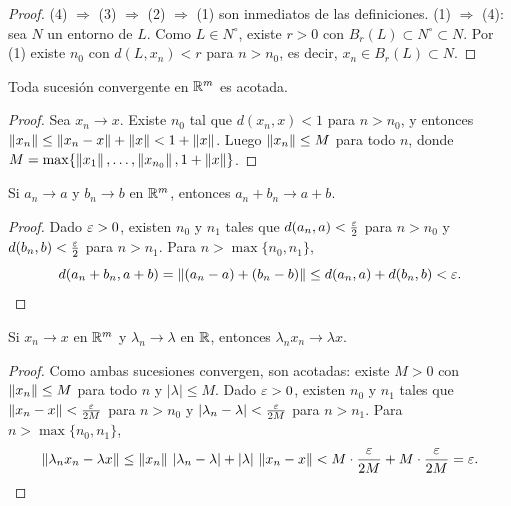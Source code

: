 \begin{proof}
  (4) \(\Rightarrow\) (3) \(\Rightarrow\) (2) \(\Rightarrow\) (1) son inmediatos de las definiciones. (1) \(\Rightarrow\) (4): sea \(N\) un entorno de \(L\). Como \(L \in N^{\circ}\), existe \(r > 0\) con \(B_r(L) \subset N^{\circ} \subset N\). Por (1) existe \(n_0\) con \(d(L, x_n) < r\) para \(n > n_0\), es decir, \(x_n \in B_r(L) \subset N\).
\end{proof}

\begin{prop}
  Toda sucesión convergente en \(\mathbb{R}^m\) es acotada.
\end{prop}

\begin{proof}
  Sea \(x_n \to x\). Existe \(n_0\) tal que \(d(x_n, x) < 1\) para \(n > n_0\), y entonces \(\left\lVert x_n \right\rVert \leq \left\lVert x_n - x \right\rVert + \left\lVert x \right\rVert < 1 + \left\lVert x \right\rVert\). Luego \(\left\lVert x_n \right\rVert \leq M\) para todo \(n\), donde \(M = \max\{ \left\lVert x_1 \right\rVert, \dots, \left\lVert x_{n_0} \right\rVert, 1 + \left\lVert x \right\rVert \}\).
\end{proof}

\begin{prop}
  Si \(a_n \to a\) y \(b_n \to b\) en \(\mathbb{R}^m\), entonces \(a_n + b_n \to a + b\).
\end{prop}

\begin{proof}
  Dado \(\varepsilon > 0\), existen \(n_0\) y \(n_1\) tales que \(d(a_n, a) < \frac{\varepsilon}{2}\) para \(n > n_0\) y \(d(b_n, b) < \frac{\varepsilon}{2}\) para \(n > n_1\). Para \(n > \max\{n_0, n_1\}\),
  \[
    d(a_n + b_n, a + b) = \left\lVert (a_n - a) + (b_n - b) \right\rVert \leq d(a_n, a) + d(b_n, b) < \varepsilon. \qedhere
  \]
\end{proof}

\begin{prop}
  Si \(x_n \to x\) en \(\mathbb{R}^m\) y \(\lambda_n \to \lambda\) en \(\mathbb{R}\), entonces \(\lambda_n x_n \to \lambda x\).
\end{prop}

\begin{proof}
  Como ambas sucesiones convergen, son acotadas: existe \(M > 0\) con \(\left\lVert x_n \right\rVert \leq M\) para todo \(n\) y \(|\lambda| \leq M\). Dado \(\varepsilon > 0\), existen \(n_0\) y \(n_1\) tales que \(\left\lVert x_n - x \right\rVert < \frac{\varepsilon}{2M}\) para \(n > n_0\) y \(|\lambda_n - \lambda| < \frac{\varepsilon}{2M}\) para \(n > n_1\). Para \(n > \max\{n_0, n_1\}\),
  \[
    \left\lVert \lambda_n x_n - \lambda x \right\rVert \leq \left\lVert x_n \right\rVert \, |\lambda_n - \lambda| + |\lambda| \, \left\lVert x_n - x \right\rVert < M \cdot \frac{\varepsilon}{2M} + M \cdot \frac{\varepsilon}{2M} = \varepsilon. \qedhere
  \]
\end{proof}

